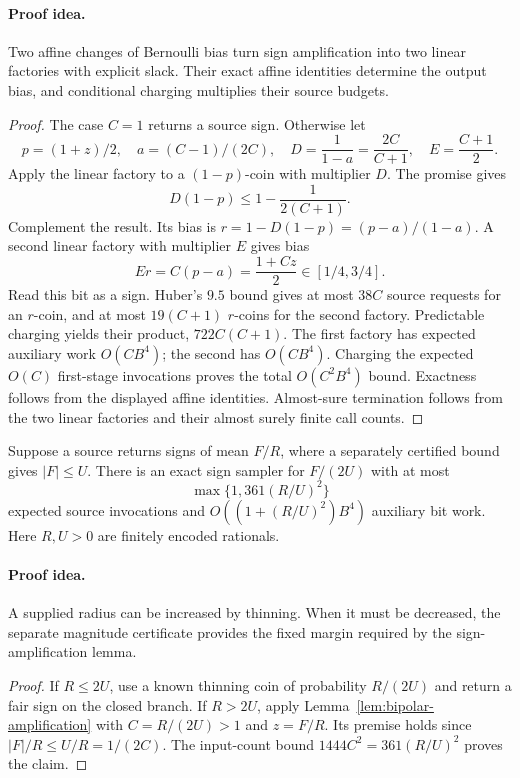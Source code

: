 \paragraph{Proof idea.}
Two affine changes of Bernoulli bias turn sign amplification into
two linear factories with explicit slack. Their exact affine identities
determine the output bias, and conditional charging multiplies their
source budgets.

\begin{proof}
The case $C=1$ returns a source sign. Otherwise let
\[
 p=(1+z)/2,\quad a=(C-1)/(2C),\quad
 D=\frac1{1-a}=\frac{2C}{C+1},\quad E=\frac{C+1}{2}.
\]
Apply the linear factory to a $(1-p)$-coin with multiplier $D$.
The promise gives
\[
 D(1-p)\le1-\frac1{2(C+1)}.
\]
Complement the result. Its bias is
$r=1-D(1-p)=(p-a)/(1-a)$. A second linear factory with multiplier $E$
gives bias
\[
 Er=C(p-a)=\frac{1+Cz}{2}\in[1/4,3/4].
\]
Read this bit as a sign. Huber's $9.5$ bound gives at most $38C$ source
requests for an $r$-coin, and at most $19(C+1)$ $r$-coins for the
second factory. Predictable charging yields their product,
$722C(C+1)$. The first factory has expected auxiliary work $O(CB^4)$;
the second has $O(CB^4)$. Charging the expected $O(C)$ first-stage
invocations proves the total $O(C^2B^4)$ bound. Exactness follows from
the displayed affine identities. Almost-sure termination follows from
the two linear factories and their almost surely finite call counts.
\end{proof}

\begin{corollary}
\label{cor:radius-reduction}
Suppose a source returns signs of mean $F/R$, where a separately
certified bound gives $|F|\le U$. There is an exact sign sampler for
$F/(2U)$ with at most
\[
 \max\{1,361(R/U)^2\}
\]
expected source invocations and $O((1+(R/U)^2)B^4)$ auxiliary bit
work. Here $R,U>0$ are finitely encoded rationals.
\end{corollary}
\paragraph{Proof idea.}
A supplied radius can be increased by thinning. When it must be
decreased, the separate magnitude certificate provides the fixed margin
required by the sign-amplification lemma.

\begin{proof}
If $R\le2U$, use a known thinning coin of probability $R/(2U)$ and
return a fair sign on the closed branch. If $R>2U$, apply
Lemma~\ref{lem:bipolar-amplification} with $C=R/(2U)>1$ and
$z=F/R$. Its premise holds since $|F|/R\le U/R=1/(2C)$. The input-count
bound $1444C^2=361(R/U)^2$ proves the claim.
\end{proof}

